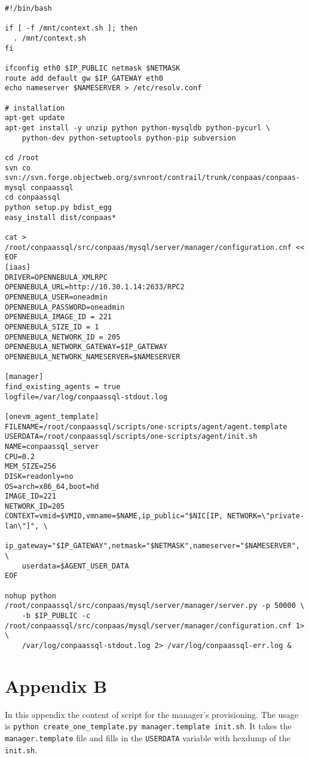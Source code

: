 \documentclass[a4paper,10pt]{article}
\begin{document}
\begin{Verbatim}[frame=single]
#!/bin/bash
 
if [ -f /mnt/context.sh ]; then
  . /mnt/context.sh
fi

ifconfig eth0 $IP_PUBLIC netmask $NETMASK
route add default gw $IP_GATEWAY eth0
echo nameserver $NAMESERVER > /etc/resolv.conf

# installation
apt-get update
apt-get install -y unzip python python-mysqldb python-pycurl \
	python-dev python-setuptools python-pip subversion

cd /root
svn co svn://svn.forge.objectweb.org/svnroot/contrail/trunk/conpaas/conpaas-mysql conpaassql
cd conpaassql
python setup.py bdist_egg
easy_install dist/conpaas*

cat > /root/conpaassql/src/conpaas/mysql/server/manager/configuration.cnf << EOF
[iaas]
DRIVER=OPENNEBULA_XMLRPC
OPENNEBULA_URL=http://10.30.1.14:2633/RPC2
OPENNEBULA_USER=oneadmin
OPENNEBULA_PASSWORD=oneadmin
OPENNEBULA_IMAGE_ID = 221
OPENNEBULA_SIZE_ID = 1
OPENNEBULA_NETWORK_ID = 205
OPENNEBULA_NETWORK_GATEWAY=$IP_GATEWAY
OPENNEBULA_NETWORK_NAMESERVER=$NAMESERVER

[manager]
find_existing_agents = true
logfile=/var/log/conpaassql-stdout.log

[onevm_agent_template]
FILENAME=/root/conpaassql/scripts/one-scripts/agent/agent.template
USERDATA=/root/conpaassql/scripts/one-scripts/agent/init.sh
NAME=conpaassql_server
CPU=0.2
MEM_SIZE=256
DISK=readonly=no
OS=arch=x86_64,boot=hd
IMAGE_ID=221
NETWORK_ID=205
CONTEXT=vmid=$VMID,vmname=$NAME,ip_public="$NIC[IP, NETWORK=\"private-lan\"]", \
	ip_gateway="$IP_GATEWAY",netmask="$NETMASK",nameserver="$NAMESERVER", \
	userdata=$AGENT_USER_DATA
EOF

nohup python /root/conpaassql/src/conpaas/mysql/server/manager/server.py -p 50000 \
	-b $IP_PUBLIC -c /root/conpaassql/src/conpaas/mysql/server/manager/configuration.cnf 1>  \
	/var/log/conpaassql-stdout.log 2> /var/log/conpaassql-err.log &

\end{Verbatim}

\newpage

\section{Appendix B}
\label{app:script}

In this appendix the content of script for the manager's provisioning. The usage is {\tt python create\_one\_template.py manager.template init.sh}. It takes the {\tt manager.template} file and fills in the {\tt USERDATA} variable with hexdump of the {\tt init.sh}.
\end{document}
